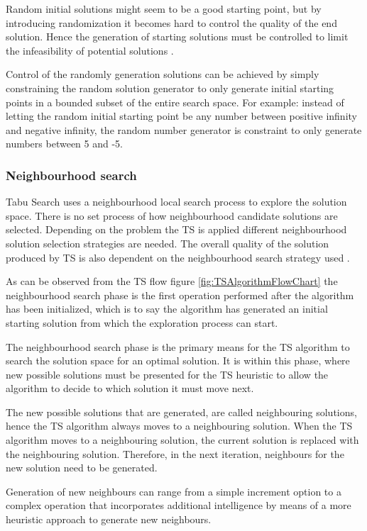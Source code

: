 Random initial solutions might seem to be a good starting point, but by introducing randomization it becomes hard to control the quality of the end solution\cite{TSHazardous}. Hence the generation of starting solutions must be controlled to limit the infeasibility of potential solutions \cite{TSHazardous}. 

Control of the randomly generation solutions can be achieved by simply constraining the random solution generator to only generate initial starting points in a bounded subset of the entire search space. For example: instead of letting the random initial starting point be any number between positive infinity and negative infinity, the random number generator is constraint to only generate numbers between 5 and -5.

\subsubsection{Neighbourhood search}
Tabu Search uses a neighbourhood local search process to explore the solution space. There is no set process of how neighbourhood candidate solutions are selected. Depending on the problem the TS is applied different neighbourhood solution selection strategies are needed. The overall quality of the solution produced by TS is also dependent on the neighbourhood search strategy used \cite{TSHazardous}. 

As can be observed from the TS flow figure \ref{fig:TSAlgorithmFlowChart} the neighbourhood search phase is the first operation performed after the algorithm has been initialized, which is to say the algorithm has generated an initial starting solution from which the exploration process can start.

The neighbourhood search phase is the primary means for the TS algorithm to search the solution space for an optimal solution. It is within this phase, where new possible solutions must be presented for the TS heuristic to allow the algorithm to decide to which solution it must move next.

The new possible solutions that are generated, are called neighbouring solutions, hence the TS algorithm always moves to a neighbouring solution. When the TS algorithm moves to a neighbouring solution, the current solution is replaced with the neighbouring solution. Therefore, in the next iteration, neighbours for the new solution need to be generated.

Generation of new neighbours can range from a simple increment option to a complex operation that incorporates additional intelligence by means of a more heuristic approach to generate new neighbours.


